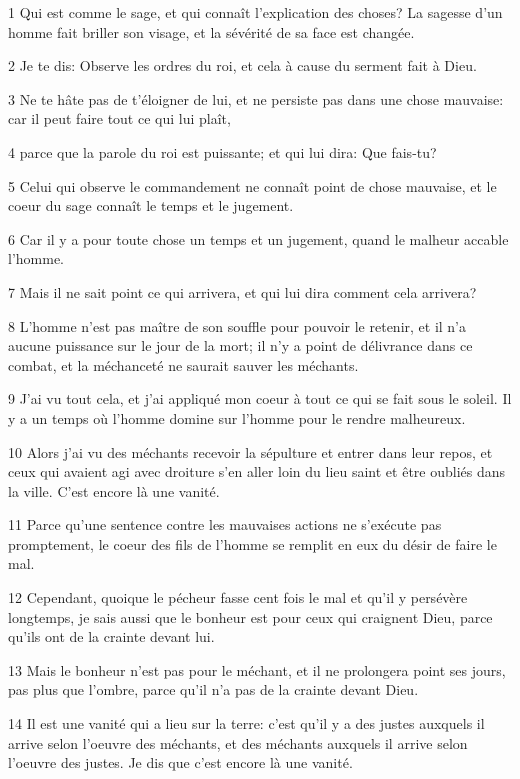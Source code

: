 \par 1 Qui est comme le sage, et qui connaît l'explication des choses? La sagesse d'un homme fait briller son visage, et la sévérité de sa face est changée.
\par 2 Je te dis: Observe les ordres du roi, et cela à cause du serment fait à Dieu.
\par 3 Ne te hâte pas de t'éloigner de lui, et ne persiste pas dans une chose mauvaise: car il peut faire tout ce qui lui plaît,
\par 4 parce que la parole du roi est puissante; et qui lui dira: Que fais-tu?
\par 5 Celui qui observe le commandement ne connaît point de chose mauvaise, et le coeur du sage connaît le temps et le jugement.
\par 6 Car il y a pour toute chose un temps et un jugement, quand le malheur accable l'homme.
\par 7 Mais il ne sait point ce qui arrivera, et qui lui dira comment cela arrivera?
\par 8 L'homme n'est pas maître de son souffle pour pouvoir le retenir, et il n'a aucune puissance sur le jour de la mort; il n'y a point de délivrance dans ce combat, et la méchanceté ne saurait sauver les méchants.
\par 9 J'ai vu tout cela, et j'ai appliqué mon coeur à tout ce qui se fait sous le soleil. Il y a un temps où l'homme domine sur l'homme pour le rendre malheureux.
\par 10 Alors j'ai vu des méchants recevoir la sépulture et entrer dans leur repos, et ceux qui avaient agi avec droiture s'en aller loin du lieu saint et être oubliés dans la ville. C'est encore là une vanité.
\par 11 Parce qu'une sentence contre les mauvaises actions ne s'exécute pas promptement, le coeur des fils de l'homme se remplit en eux du désir de faire le mal.
\par 12 Cependant, quoique le pécheur fasse cent fois le mal et qu'il y persévère longtemps, je sais aussi que le bonheur est pour ceux qui craignent Dieu, parce qu'ils ont de la crainte devant lui.
\par 13 Mais le bonheur n'est pas pour le méchant, et il ne prolongera point ses jours, pas plus que l'ombre, parce qu'il n'a pas de la crainte devant Dieu.
\par 14 Il est une vanité qui a lieu sur la terre: c'est qu'il y a des justes auxquels il arrive selon l'oeuvre des méchants, et des méchants auxquels il arrive selon l'oeuvre des justes. Je dis que c'est encore là une vanité.
